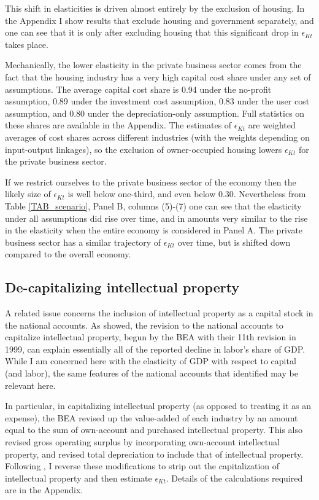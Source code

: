 \documentclass[11pt]{article}
\begin{document}
This shift in elasticities is driven almost entirely by the exclusion of housing. In the Appendix I show results that exclude housing and government separately, and one can see that it is only after excluding housing that this significant drop in $\epsilon_{Kt}$ takes place. 

Mechanically, the lower elasticity in the private business sector comes from the fact that the housing industry has a very high capital cost share under any set of assumptions. The average capital cost share is 0.94 under the no-profit assumption, 0.89 under the investment cost assumption, 0.83 under the user cost assumption, and 0.80 under the depreciation-only assumption. Full statistics on these shares are available in the Appendix. The estimates of $\epsilon_{Kt}$ are weighted averages of cost shares across different industries (with the weights depending on input-output linkages), so the exclusion of owner-occupied housing lowers $\epsilon_{Kt}$ for the private business sector. 

If we restrict ourselves to the private business sector of the economy then the likely size of $\epsilon_{Kt}$ is well below one-third, and even below 0.30. Nevertheless from Table \ref{TAB_scenario}, Panel B, columns (5)-(7) one can see that the elasticity under all assumptions did rise over time, and in amounts very similar to the rise in the elasticity when the entire economy is considered in Panel A. The private business sector has a similar trajectory of $\epsilon_{Kt}$ over time, but is shifted down compared to the overall economy.

\subsection{De-capitalizing intellectual property}
A related issue concerns the inclusion of intellectual property as a capital stock in the national accounts. As \cite{ksz2020} showed, the revision to the national accounts to capitalize intellectual property, begun by the BEA with their 11th revision in 1999, can explain essentially all of the reported decline in labor's share of GDP. While I am concerned here with the elasticity of GDP with respect to capital (and labor), the same features of the national accounts that \cite{ksz2020} identified may be relevant here. 

In particular, in capitalizing intellectual property (as opposed to treating it as an expense), the BEA revised up the value-added of each industry by an amount equal to the sum of own-account and purchased intellectual property. This also revised gross operating surplus by incorporating own-account intellectual property, and revised total depreciation to include that of intellectual property. Following \cite{ksz2020}, I reverse these modifications to strip out the capitalization of intellectual property and then estimate $\epsilon_{Kt}$. Details of the calculations required are in the Appendix.
\end{document}
